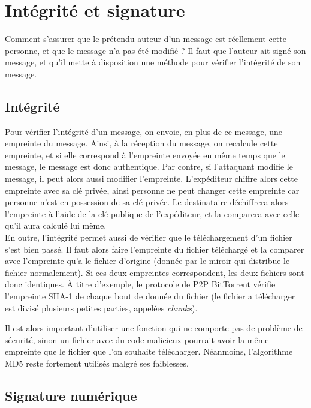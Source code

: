 
\section{Intégrité et signature}
Comment s'assurer que le prétendu auteur d'un message est
réellement cette personne, et que le message n'a pas été modifié ?
Il faut que l'auteur ait signé son message, et qu'il mette à
disposition une méthode pour vérifier l'intégrité de son message.

\subsection{Intégrité}
Pour vérifier l'intégrité d'un message, on envoie, en plus de ce
message, une empreinte du message. Ainsi, à la réception du
message, on recalcule cette empreinte, et si elle correspond à
l'empreinte envoyée en même temps que le message, le message est
donc authentique. Par contre, si l'attaquant modifie le message,
il peut alors aussi modifier l'empreinte. L'expéditeur chiffre
alors cette empreinte avec sa clé privée, ainsi personne ne peut
changer cette empreinte car personne n'est en possession de sa clé
privée. Le destinataire déchiffrera alors l'empreinte à l'aide de
la clé publique de l'expéditeur, et la comparera avec celle qu'il
aura calculé lui même.
\\

En outre, l'intégrité permet aussi de vérifier que le
téléchargement d'un fichier s'est bien passé. Il faut alors faire
l'empreinte du fichier téléchargé et la comparer avec l'empreinte
qu'a le fichier d'origine (donnée par le miroir qui distribue le
fichier normalement). Si ces deux empreintes correspondent, les
deux fichiers sont donc identiques. À titre d'exemple, le protocole
de P2P BitTorrent vérifie l'empreinte SHA-1 de chaque bout de donnée
du fichier 
(le fichier a télécharger est divisé plusieurs petites parties, 
appelées \emph{chunks}).  

Il est alors important d'utiliser une fonction qui ne comporte pas
de problème de sécurité, sinon un fichier avec du code malicieux
pourrait avoir la même empreinte que le fichier que l'on souhaite
télécharger. Néanmoins, l'algorithme MD5 reste fortement utilisés
malgré ses faiblesses.

\subsection{Signature numérique}
